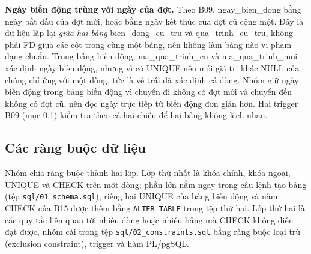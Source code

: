 \textbf{Ngày biến động trùng với ngày của đợt.} Theo B09, ngay\_bien\_dong bằng ngày bắt đầu của đợt mới, hoặc bằng ngày kết thúc của đợt cũ cộng một. Đây là dữ liệu lặp lại \emph{giữa hai bảng} bien\_dong\_cu\_tru và qua\_trinh\_cu\_tru, không phải FD giữa các cột trong cùng một bảng, nên không làm bảng nào vi phạm dạng chuẩn. Trong bảng biến động, ma\_qua\_trinh\_cu và ma\_qua\_trinh\_moi xác định ngày biến động, nhưng vì có UNIQUE nên mỗi giá trị khác NULL của chúng chỉ ứng với một dòng, tức là vế trái đã xác định cả dòng. Nhóm giữ ngày biến động trong bảng biến động vì chuyển đi không có đợt mới và chuyển đến không có đợt cũ, nên đọc ngày trực tiếp từ biến động đơn giản hơn. Hai trigger B09 (mục \ref{subsec:rangbuoc}) kiểm tra theo cả hai chiều để hai bảng không lệch nhau.

\subsection{Các ràng buộc dữ liệu}
\label{subsec:rangbuoc}

Nhóm chia ràng buộc thành hai lớp. Lớp thứ nhất là khóa chính, khóa ngoại, UNIQUE và CHECK trên một dòng; phần lớn nằm ngay trong câu lệnh tạo bảng (tệp \texttt{sql/01\_schema.sql}), riêng hai UNIQUE của bảng biến động và năm CHECK của B15 được thêm bằng \texttt{ALTER TABLE} trong tệp thứ hai. Lớp thứ hai là các quy tắc liên quan tới nhiều dòng hoặc nhiều bảng mà CHECK không diễn đạt được, nhóm cài trong tệp \texttt{sql/02\_constraints.sql} bằng ràng buộc loại trừ (exclusion constraint), trigger và hàm PL/pgSQL.

